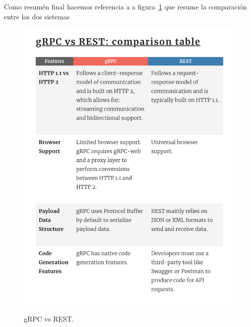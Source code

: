Como resumén final hacemos referencia a a figura~\cref{fig:gRPC vs REST} que resume la comparación entre los dos sistemas

\begin{figure}[H]
    \centering
    \includegraphics[height=0.3\textheight]{./part/Proyecto_ejecutivo/memoria_constructiva/rpc/img/rpcComparison}
    \caption{gRPC vs REST.\cite{berga_santos_2023}}\label{fig:gRPC vs REST}
\end{figure}